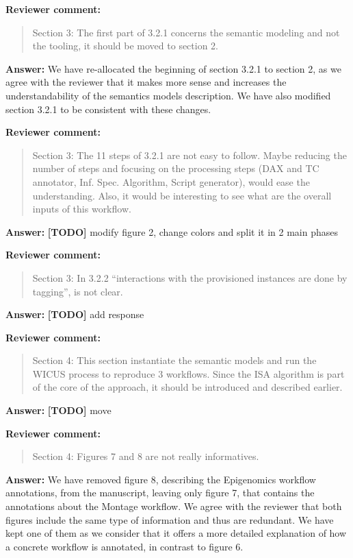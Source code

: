 \documentclass{letter}
\newenvironment{review}%
{\textbf{Reviewer comment:}\begin{quote}}%
{\end{quote}}%
\newcommand{\todo}[1]{%
      \color{red}\textbf{[TODO]} #1\color{black}}
\newcommand{\answer}[1]{%
      \textbf{Answer:} #1}
\begin{document}
\begin{letter}{}
\begin{review}
Section 3: The first part of 3.2.1 concerns the semantic modeling and not the tooling, it should be moved to section 2.
\end{review}

\answer{We have re-allocated the beginning of section 3.2.1 to section 2, as we agree with the reviewer that it makes  more sense and increases the understandability of the semantics models description. We have also modified section 3.2.1 to be consistent with these changes.}


\begin{review}
Section 3: The 11 steps of 3.2.1 are not easy to follow. Maybe reducing the number of steps and focusing on the processing steps (DAX and TC annotator, Inf. Spec. Algorithm, Script generator), would ease the understanding. Also, it would be interesting to see what are the overall inputs of this workflow.
\end{review}

\answer{\todo{modify figure 2, change colors and split it in 2 main phases}}


\begin{review}
Section 3: In 3.2.2 ``interactions with the provisioned instances are done by tagging'', is not clear.
\end{review}

\answer{\todo{add response}}


\begin{review}
Section 4: This section instantiate the semantic models and run the WICUS process to reproduce 3 workflows. Since the ISA algorithm is part of the core of the approach, it should be introduced and described earlier.
\end{review}

\answer{\todo{move}}


\begin{review}
Section 4: Figures 7 and 8 are not really informatives.
\end{review}

\answer{We have removed figure 8, describing the Epigenomics workflow annotations, from the manuscript, leaving only figure 7, that contains the annotations about the Montage workflow. We agree with the reviewer that both figures include the same type of information and thus are redundant. We have kept one of them as we consider that it offers a more detailed explanation of how a concrete workflow is annotated, in contrast to figure 6.}



\end{letter}
\end{document}
